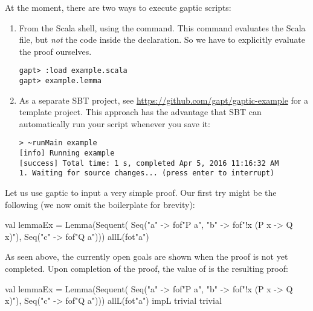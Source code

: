 \documentclass[a4paper,11pt]{book}
\newcommand{\cli}[1]{{\ttfamily {#1}}}
\begin{document}
At the moment, there are two ways to execute gaptic scripts:
\begin{enumerate}

  \item From the Scala shell, using the \cli{:load} command.  This command
        evaluates the Scala file, but \emph{not} the code inside the \cli{object}
        declaration.  So we have to explicitly evaluate the proof ourselves.
        \begin{lstlisting}
gapt> :load example.scala
gapt> example.lemma
\end{lstlisting}

  \item As a separate SBT project, see
        \url{https://github.com/gapt/gaptic-example} for a template project.  This
        approach has the advantage that SBT can automatically run your script whenever
        you save it:
        \begin{lstlisting}
> ~runMain example
[info] Running example 
[success] Total time: 1 s, completed Apr 5, 2016 11:16:32 AM
1. Waiting for source changes... (press enter to interrupt)
\end{lstlisting}

\end{enumerate}

Let us use gaptic to input a very simple proof.  Our first try might be the
following (we now omit the boilerplate for brevity):
\begin{tacticslisting}
  val lemmaEx =
  Lemma(Sequent(
  Seq("a" -> fof"P a", "b" -> fof"!x (P x -> Q x)"),
  Seq("c" -> fof"Q a"))) {
      allL(fot"a")
    }
\end{tacticslisting}

As seen above, the currently open goals are shown when the proof is not yet
completed. Upon completion of the proof, the value of \cli{lemmaEx} is the
resulting proof:
\begin{tacticslisting}
  val lemmaEx =
  Lemma(Sequent(
  Seq("a" -> fof"P a", "b" -> fof"!x (P x -> Q x)"),
  Seq("c" -> fof"Q a"))) {
      allL(fot"a")
      impL
      trivial
      trivial
    }
\end{tacticslisting}
\begin{tacticsoutput}
\end{tacticsoutput}
\end{document}
